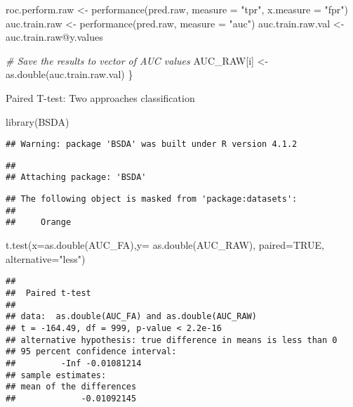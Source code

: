 \documentclass[
]{article}
\newenvironment{Shaded}{\begin{snugshade}}{\end{snugshade}}
\newcommand{\AttributeTok}[1]{\textcolor[rgb]{0.77,0.63,0.00}{#1}}
\newcommand{\CommentTok}[1]{\textcolor[rgb]{0.56,0.35,0.01}{\textit{#1}}}
\newcommand{\ConstantTok}[1]{\textcolor[rgb]{0.00,0.00,0.00}{#1}}
\newcommand{\FunctionTok}[1]{\textcolor[rgb]{0.00,0.00,0.00}{#1}}
\newcommand{\NormalTok}[1]{#1}
\newcommand{\OtherTok}[1]{\textcolor[rgb]{0.56,0.35,0.01}{#1}}
\newcommand{\SpecialCharTok}[1]{\textcolor[rgb]{0.00,0.00,0.00}{#1}}
\newcommand{\StringTok}[1]{\textcolor[rgb]{0.31,0.60,0.02}{#1}}
\begin{document}
\begin{Shaded}
\begin{Highlighting}[]
\NormalTok{    roc.perform.raw }\OtherTok{\textless{}{-}}
        \FunctionTok{performance}\NormalTok{(pred.raw, }\AttributeTok{measure =} \StringTok{"tpr"}\NormalTok{, }\AttributeTok{x.measure =} \StringTok{"fpr"}\NormalTok{)}
\NormalTok{    auc.train.raw }\OtherTok{\textless{}{-}} \FunctionTok{performance}\NormalTok{(pred.raw, }\AttributeTok{measure =} \StringTok{"auc"}\NormalTok{)}
\NormalTok{    auc.train.raw.val }\OtherTok{\textless{}{-}}\NormalTok{ auc.train.raw}\SpecialCharTok{@}\NormalTok{y.values}
    
    \CommentTok{\# Save the results to vector of AUC values }
\NormalTok{    AUC\_RAW[i] }\OtherTok{\textless{}{-}} \FunctionTok{as.double}\NormalTok{(auc.train.raw.val)}
\NormalTok{\}}
\end{Highlighting}
\end{Shaded}

Paired T-test: Two approaches classification

\begin{Shaded}
\begin{Highlighting}[]
\FunctionTok{library}\NormalTok{(BSDA)}
\end{Highlighting}
\end{Shaded}

\begin{verbatim}
## Warning: package 'BSDA' was built under R version 4.1.2
\end{verbatim}

\begin{verbatim}
## 
## Attaching package: 'BSDA'
\end{verbatim}

\begin{verbatim}
## The following object is masked from 'package:datasets':
## 
##     Orange
\end{verbatim}

\begin{Shaded}
\begin{Highlighting}[]
\FunctionTok{t.test}\NormalTok{(}\AttributeTok{x=}\FunctionTok{as.double}\NormalTok{(AUC\_FA),}\AttributeTok{y=} \FunctionTok{as.double}\NormalTok{(AUC\_RAW), }\AttributeTok{paired=}\ConstantTok{TRUE}\NormalTok{, }\AttributeTok{alternative=}\StringTok{"less"}\NormalTok{)}
\end{Highlighting}
\end{Shaded}

\begin{verbatim}
## 
##  Paired t-test
## 
## data:  as.double(AUC_FA) and as.double(AUC_RAW)
## t = -164.49, df = 999, p-value < 2.2e-16
## alternative hypothesis: true difference in means is less than 0
## 95 percent confidence interval:
##         -Inf -0.01081214
## sample estimates:
## mean of the differences 
##             -0.01092145
\end{verbatim}
\end{document}
